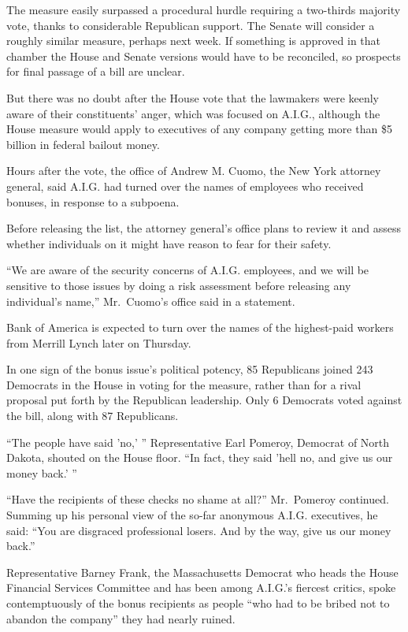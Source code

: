 \documentclass[12pt,a4paper,onecolumn]{article}
\begin{document}
\begin{CJK*}{GBK}{song}
The measure easily surpassed a procedural hurdle requiring a two-thirds majority vote, thanks to
considerable Republican support. The Senate will consider a roughly similar measure, perhaps next
week. If something is approved in that chamber the House and Senate versions would have to be
reconciled, so prospects for final passage of a bill are unclear.

But there was no doubt after the House vote that the lawmakers were keenly aware of their
constituents' anger, which was focused on A.I.G., although the House measure would apply to
executives of any company getting more than \$5 billion in federal bailout money.

Hours after the vote, the office of Andrew M. Cuomo, the New York attorney general, said A.I.G. had
turned over the names of employees who received bonuses, in response to a subpoena.

Before releasing the list, the attorney general's office plans to review it and assess whether
individuals on it might have reason to fear for their safety.

``We are aware of the security concerns of A.I.G. employees, and we will be sensitive to those
issues by doing a risk assessment before releasing any individual's name,'' Mr.~Cuomo's office said
in a statement.

Bank of America is expected to turn over the names of the highest-paid workers from Merrill Lynch
later on Thursday.

In one sign of the bonus issue's political potency, 85 Republicans joined 243 Democrats in the House
in voting for the measure, rather than for a rival proposal put forth by the Republican leadership.
Only 6 Democrats voted against the bill, along with 87 Republicans.

``The people have said 'no,' '' Representative Earl Pomeroy, Democrat of North Dakota, shouted on
the House floor. ``In fact, they said 'hell no, and give us our money back.' ''

``Have the recipients of these checks no shame at all?'' Mr.~Pomeroy continued. Summing up his
personal view of the so-far anonymous A.I.G. executives, he said: ``You are disgraced professional
losers. And by the way, give us our money back.''

Representative Barney Frank, the Massachusetts Democrat who heads the House Financial Services
Committee and has been among A.I.G.'s fiercest critics, spoke contemptuously of the bonus recipients
as people ``who had to be bribed not to abandon the company'' they had nearly ruined.


\end{CJK*}
\end{document}
